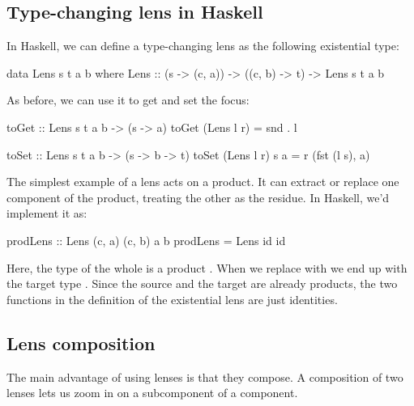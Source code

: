 \documentclass[DaoFP]{subfiles}
\begin{document}
\subsection{Type-changing lens in Haskell}
In Haskell, we can define a type-changing lens as the following existential type:
\begin{haskell}
data Lens s t a b where
 Lens :: (s -> (c, a)) -> ((c, b) -> t) -> Lens s t a b
\end{haskell}
As before, we can use it to get and set the focus:
\begin{haskell}
toGet :: Lens s t a b -> (s -> a)
toGet (Lens l r) = snd . l

toSet :: Lens s t a b -> (s -> b -> t)
toSet (Lens l r) s a = r (fst (l s), a)
\end{haskell}

The simplest example of a lens acts on a product. It can extract or replace one component of the product, treating the other as the residue. In Haskell, we'd implement it as:
\begin{haskell}
prodLens :: Lens (c, a) (c, b) a b
prodLens = Lens id id
\end{haskell}
Here, the type of the whole is a product . When we replace  with  we end up with the target type . Since the source and the target are already products, the two functions in the definition of the existential lens are just identities.

\subsection{Lens composition}

The main advantage of using lenses is that they compose. A composition of two lenses lets us zoom in on a subcomponent of a component. 
\end{document}
